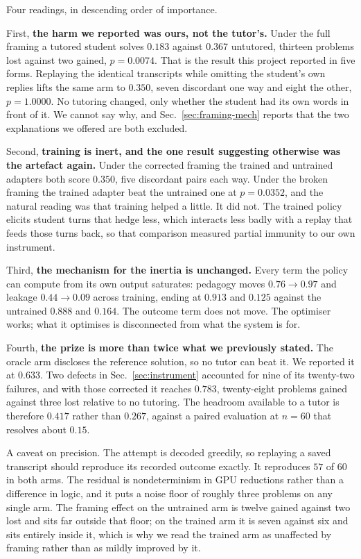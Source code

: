 Four readings, in descending order of importance.

First, \textbf{the harm we reported was ours, not the tutor's.} Under the full
framing a tutored student solves $0.183$ against $0.367$ untutored, thirteen
problems lost against two gained, $p{=}0.0074$. That is the result this project
reported in five forms. Replaying the identical transcripts while omitting the
student's own replies lifts the same arm to $0.350$, seven discordant one way
and eight the other, $p{=}1.0000$. No tutoring changed, only whether the student
had its own words in front of it. We cannot say why, and
Sec.~\ref{sec:framing-mech} reports that the two explanations we offered are
both excluded.

Second, \textbf{training is inert, and the one result suggesting otherwise was
the artefact again.} Under the corrected framing the trained and untrained
adapters both score $0.350$, five discordant pairs each way. Under the broken
framing the trained adapter beat the untrained one at $p{=}0.0352$, and the
natural reading was that training helped a little. It did not. The trained
policy elicits student turns that hedge less, which interacts less badly with a
replay that feeds those turns back, so that comparison measured partial immunity
to our own instrument.

Third, \textbf{the mechanism for the inertia is unchanged.} Every term the
policy can compute from its own output saturates: pedagogy moves
$0.76\rightarrow0.97$ and leakage $0.44\rightarrow0.09$ across training, ending
at $0.913$ and $0.125$ against the untrained $0.888$ and $0.164$. The outcome
term does not move. The optimiser works; what it optimises is disconnected from
what the system is for.

Fourth, \textbf{the prize is more than twice what we previously stated.} The
oracle arm discloses the reference solution, so no tutor can beat it. We
reported it at $0.633$. Two defects in Sec.~\ref{sec:instrument} accounted for
nine of its twenty-two failures, and with those corrected it reaches $0.783$,
twenty-eight problems gained against three lost relative to no tutoring. The
headroom available to a tutor is therefore $0.417$ rather than $0.267$, against
a paired evaluation at $n{=}60$ that resolves about $0.15$.

A caveat on precision. The attempt is decoded greedily, so replaying a saved
transcript should reproduce its recorded outcome exactly. It reproduces $57$ of
$60$ in both arms. The residual is nondeterminism in GPU reductions rather than
a difference in logic, and it puts a noise floor of roughly three problems on
any single arm. The framing effect on the untrained arm is twelve gained against
two lost and sits far outside that floor; on the trained arm it is seven against
six and sits entirely inside it, which is why we read the trained arm as
unaffected by framing rather than as mildly improved by it.


